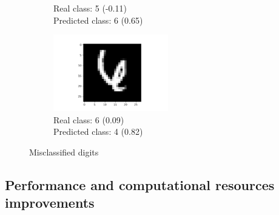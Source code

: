 \documentclass[a4paper]{article}    %
\begin{document}
\begin{figure}[H]
\begin{subfigure}{0.32\textwidth}
        \caption{
            Real class: 5 (-0.11)\\
            Predicted class: 6 (0.65)}
        \label{fig:example_11}
    \end{subfigure}
    \hfill
    \begin{subfigure}{0.32\textwidth}
        \centering
        \includegraphics[width=5.0cm]{29}
        \caption{
            Real class: 6 (0.09)\\
            Predicted class: 4 (0.82)}
        \label{fig:example_12}
    \end{subfigure}
    \hfill
    \caption{Misclassified digits} 
    \label{fig:misclassified_digits}
\end{figure}

\newpage

\subsection{Performance and computational resources improvements}
\end{document}
